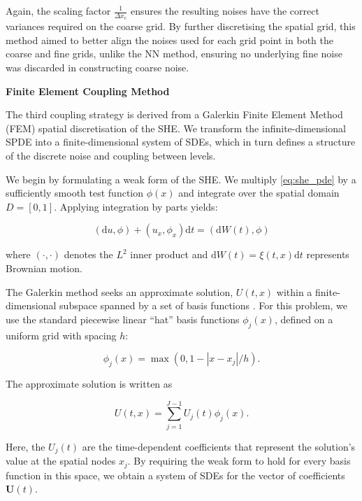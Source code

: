 Again, the scaling factor
$\frac{1}{\Delta x_c}$ ensures the resulting
noises have the correct variances required on 
the coarse grid. 
By further discretising the spatial grid, 
this method aimed to better align the noises 
used for each grid point in both the coarse
and fine grids, unlike the NN method, ensuring
no underlying fine noise was discarded in 
constructing coarse noise.
\newline

\textbf{Finite Element Coupling Method}

The third coupling strategy is derived from a Galerkin Finite Element Method
(FEM) \cite{suli2025fe} spatial discretisation of the SHE. We transform 
the infinite-dimensional SPDE into a finite-dimensional system of SDEs, 
which in turn defines a structure of the discrete noise and coupling between 
levels.

We begin by formulating a weak form of the SHE. We multiply \eqref{eq:she_pde} by 
a sufficiently smooth test function $\phi(x)$ and integrate over the spatial domain 
$D = [0,1]$. Applying integration by parts yields:

\begin{equation}\label{eq:she_differential_form}
    (\mathrm{d}u,\phi) + (u_x, \phi_x)\mathrm{d}t = (\mathrm{d}W(t), \phi)
\end{equation}

where $(\cdot, \cdot)$ denotes the $L^2$ inner product and  
$\mathrm{d}W(t) = \xi(t,x)\mathrm{d}t$ represents Brownian
motion.

The Galerkin method seeks an approximate solution, $U(t,x)$ within a finite-dimensional
subspace spanned by a set of basis functions \cite{suli2025fe}. For this problem, 
we use the standard piecewise linear ``hat'' basis functions $\phi_j(x)$, defined on a 
uniform grid with spacing $h$:

\begin{equation*}
    \phi_j(x) = \max(0, 1 - |x-x_j|/ h).
\end{equation*}

The approximate solution is written as

\begin{equation*}
    U(t,x) = \sum_{j=1}^{J-1}U_j(t)\phi_j(x).
\end{equation*}

Here, the $U_j(t)$ are the time-dependent coefficients that represent the solution's value at
the spatial nodes $x_j$. By requiring the weak form to hold for every basis function 
in this space, we obtain a system of SDEs for the vector of coefficients $\mathbf{U}(t)$. 

